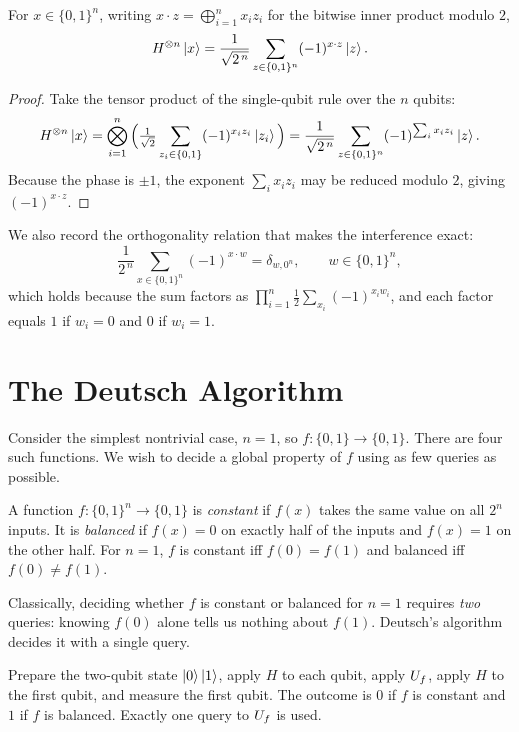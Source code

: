 \begin{lemma}
\label{l3:lem:had}
For $x\in\{0,1\}^n$, writing $x\cdot z=\bigoplus_{i=1}^{n}x_i z_i$ for the bitwise
inner product modulo $2$,
\[
  H^{\otimes n}\ket{x}=\frac{1}{\sqrt{2^{\,n}}}\sum_{z\in\{0,1\}^n}(-1)^{x\cdot z}\ket{z}.
\]
\end{lemma}

\begin{proof}
Take the tensor product of the single-qubit rule over the $n$ qubits:
\[
  H^{\otimes n}\ket{x}
  =\bigotimes_{i=1}^{n}\Big(\tfrac{1}{\sqrt2}\sum_{z_i\in\{0,1\}}(-1)^{x_i z_i}\ket{z_i}\Big)
  =\frac{1}{\sqrt{2^{\,n}}}\sum_{z\in\{0,1\}^n}(-1)^{\sum_i x_i z_i}\ket{z}.
\]
Because the phase is $\pm1$, the exponent $\sum_i x_i z_i$ may be reduced modulo
$2$, giving $(-1)^{x\cdot z}$.
\end{proof}

We also record the orthogonality relation that makes the interference exact:
\[
  \frac{1}{2^{\,n}}\sum_{x\in\{0,1\}^n}(-1)^{x\cdot w}
  =\delta_{w,0^n},
  \qquad w\in\{0,1\}^n,
\]
which holds because the sum factors as $\prod_{i=1}^{n}\tfrac12\sum_{x_i}(-1)^{x_i w_i}$,
and each factor equals $1$ if $w_i=0$ and $0$ if $w_i=1$.

\section{The Deutsch Algorithm}

Consider the simplest nontrivial case, $n=1$, so $f:\{0,1\}\to\{0,1\}$. There are
four such functions. We wish to decide a global property of $f$ using as few
queries as possible.

\begin{definition}
\label{l3:def:constbal}
A function $f:\{0,1\}^n\to\{0,1\}$ is \emph{constant} if $f(x)$ takes the same value
on all $2^n$ inputs. It is \emph{balanced} if $f(x)=0$ on exactly half of the inputs
and $f(x)=1$ on the other half. For $n=1$, $f$ is constant iff $f(0)=f(1)$ and
balanced iff $f(0)\neq f(1)$.
\end{definition}

Classically, deciding whether $f$ is constant or balanced for $n=1$ requires
\emph{two} queries: knowing $f(0)$ alone tells us nothing about $f(1)$. Deutsch's
algorithm decides it with a single query.

\begin{theorem}
\label{l3:thm:deutsch}
Prepare the two-qubit state $\ket{0}\ket{1}$, apply $H$ to each qubit, apply $U_f$,
apply $H$ to the first qubit, and measure the first qubit. The outcome is $0$ if
$f$ is constant and $1$ if $f$ is balanced. Exactly one query to $U_f$ is used.
\end{theorem}

